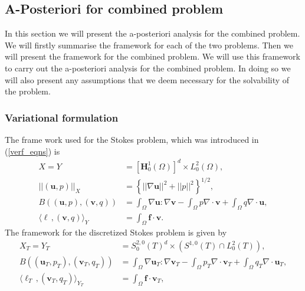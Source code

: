 \documentclass[12pt,a4paper]{article}
\theoremstyle{definition}
\begin{document}
\subsection{A-Posteriori for combined problem}
In this section we will present the a-posteriori analysis for the combined problem.  We will firstly summarise the framework for each of the two problems.  Then we will present the framework for the combined problem.   We will use this framework to carry out the a-posteriori analysis for the combined problem.  In doing so we will also present any assumptions that we deem necessary for the solvability of the problem.
\subsubsection{Variational formulation}\label{sec_combi_var_form}
The frame work used for the Stokes problem, which was introduced in (\ref{verf_eqns}) is 
\begin{equation}\label{frame_stokes}
\begin{aligned}
X=Y&=\left[\textbf{H}^1_0\left(\Omega\right)\right]^d\times L^2_0\left(\Omega\right),\\
\left|\left|\left(\textbf{u},p\right)\right|\right|_X&=\left\lbrace \left|\left|\nabla\textbf{u}\right|\right|^2 + \left|\left|p\right|\right|^2\right\rbrace^{1/2},\\
B\left(\left(\textbf{u},p\right),\left(\textbf{v},q\right)\right)&=\int_{\Omega}\nabla \textbf{u} : \nabla \textbf{v} - \int_{\Omega} p \nabla\cdot\textbf{v} + \int_{\Omega} q \nabla\cdot\textbf{u},\\
\langle \ell\,,\left(\textbf{v},q\right) \rangle_Y &= \int_{\Omega}\textbf{f}\cdot \textbf{v}.
\end{aligned}
\end{equation}
The framework for the discretized Stokes problem is given by 
\begin{equation}\label{frame_stokes_disc}
\begin{aligned}
X_T=Y_T&=S_0^{2,0}\left(T\right)^d\times \left(S^{1,0}\left(T\right)\cap L^2_0\left(T\right)\right),\\
B\left(\left(\textbf{u}_T,p_T\right),\left(\textbf{v}_T,q_T\right)\right)&=\int_{\Omega}\nabla \textbf{u}_T : \nabla \textbf{v}_T - \int_{\Omega} p_T \nabla\cdot\textbf{v}_T + \int_{\Omega} q_T \nabla\cdot\textbf{u}_T,\\
\langle \ell_T\,,\left(\textbf{v}_T,q_T\right) \rangle_{Y_T} &= \int_{\Omega}\textbf{f}\cdot \textbf{v}_T,
\end{aligned}
\end{equation}
\end{document}

